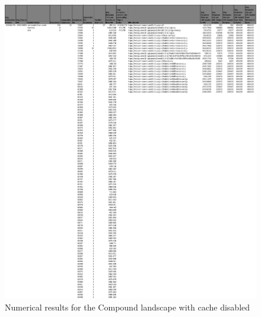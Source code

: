 \begin{figure}[!h]
	\centering
	\begin{adjustbox}{width=\textwidth,totalheight=0.8\textheight}
		\includegraphics[angle=90]{Figures/compound_allhar.pdf}
	\end{adjustbox}
	\caption{Numerical results for the Compound landscape with cache disabled}
	\label{fig:appendix_1_21}
\end{figure}
\newpage
